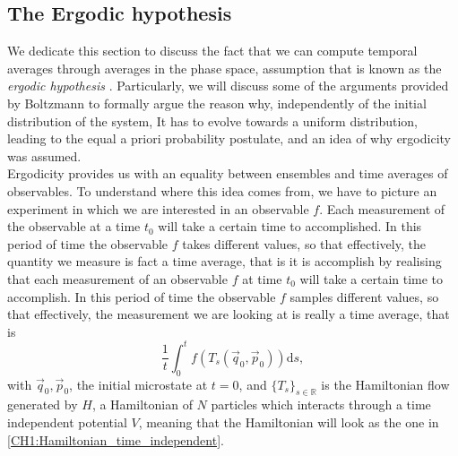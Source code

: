 \subsection{The Ergodic hypothesis} 
We dedicate this section to discuss the fact that we can compute temporal averages through averages in the phase space,  assumption that is known as the \textit{ergodic hypothesis} \cite{farquhar_ergodic_1965}. Particularly, we will discuss some of the arguments provided by Boltzmann \cite{boltzmann1871prioritat, boltzmann_einige_1871} to formally argue the reason why, independently of the initial distribution of the system, It has to evolve towards a uniform distribution, leading to the equal a priori probability postulate, and an idea of why ergodicity was assumed.\\
\indent Ergodicity provides us with an equality between ensembles and time averages of observables. To understand where this idea comes from, we have to picture an experiment in which we are interested in an observable $f$. Each measurement of the observable at a time $t_0$ will take a certain time to accomplished. In this period of time the observable $f$ takes different values, so that effectively, the quantity we measure is fact a time average, that is 
  it is accomplish by realising that each measurement of an observable $f$ at time $t_0$ will take a certain time to accomplish. In this period of time the observable $f$ samples different values, so that effectively, the measurement we are looking at is really a time average, that is
\begin{equation}
\frac{1}{t} \int_{0}^{t} f\left(T_{s}\left(\vec{q}_{0}, \vec{p}_{0}\right)\right) \mathrm{d} s,
\end{equation}
with $\vec{q}_{0}, \vec{p}_{0}$, the initial microstate at $t=0$, and $\{T_s\}_{s\in \mathbb{R}}$ is the Hamiltonian flow generated by $H$, a Hamiltonian of $N$ particles which interacts through a time independent potential $V$, meaning that the Hamiltonian will look as the one in \eqref{CH1:Hamiltonian_time_independent}.
